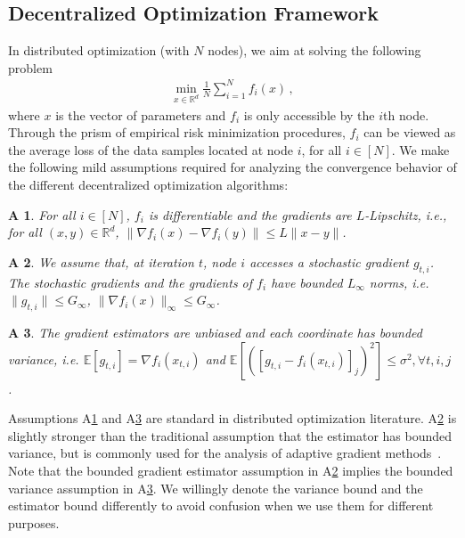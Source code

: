 \documentclass[anon,12pt]{colt2021} %
\newtheorem{assumptionA}{A\!\!}
\begin{document}
\vspace{-0.05in}
\subsection{Decentralized Optimization Framework}
\vspace{-0.05in}

In distributed optimization (with $N$ nodes), we aim at solving the following problem
\begin{align}\label{eq:minproblem}
\min_{x \in \mathbb{R}^d} \frac{1}{N}\sum_{i=1}^N f_i(x) \, ,
\end{align}
where $x$ is the vector of parameters and $f_i$ is only accessible by the $i$th node. 
Through the prism of empirical risk minimization procedures, $f_i$ can be viewed as the average loss of the data samples located at node $i$, for all $i \in [N]$. 
We make the following mild assumptions required for analyzing the convergence behavior of the different decentralized optimization algorithms:
\begin{assumptionA}\label{a:diff}
For all $i \in [N]$, $f_i$ is differentiable and the gradients are $L$-Lipschitz, i.e., for all $(x, y) \in \mathbb{R}^d$, $\|\nabla f_i(x) - \nabla f_i(y) \| \leq L\|x-y\|$.
\end{assumptionA}
\begin{assumptionA}\label{a:boundsto}
We assume that, at iteration $t$, node $i$ accesses a stochastic gradient $g_{t,i}$. The stochastic gradients and the gradients of $f_i$ have bounded $L_{\infty}$ norms, i.e. $\|g_{t,i}\| \leq G_{\infty}$, $\|\nabla f_i(x)\|_{\infty} \leq G_{\infty}$. 
\end{assumptionA}
\begin{assumptionA}\label{a:boundedvar}
The gradient estimators are unbiased and each coordinate has bounded variance, i.e. $\mathbb E [g_{t,i}] = \nabla f_i(x_{t,i}) $ and $\mathbb E [([g_{t,i} - f_i(x_{t,i})]_j)^2] \leq  \sigma^2, \forall t,i,j$ . 
\end{assumptionA}
Assumptions A\ref{a:diff} and A\ref{a:boundedvar} are standard in distributed optimization literature. A\ref{a:boundsto} is slightly stronger than the traditional assumption that the estimator has bounded variance, but is commonly used for the analysis of adaptive gradient methods~\cite{chen2018convergence,ward2019adagrad}. 
Note that the bounded gradient estimator assumption in A\ref{a:boundsto} implies the bounded variance assumption in A\ref{a:boundedvar}.
 We willingly denote the variance bound and the estimator bound differently to avoid confusion when we use them for different purposes. 
\end{document}
